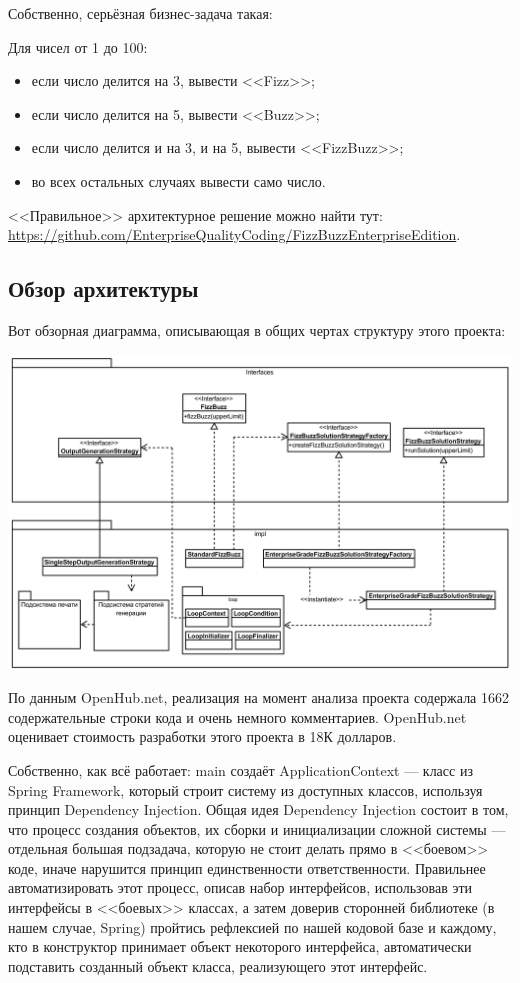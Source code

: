 \documentclass[a5paper]{article}
\begin{document}
Собственно, серьёзная бизнес-задача такая:

Для чисел от 1 до 100:
\begin{itemize}
    \item если число делится на 3, вывести <<Fizz>>;
    \item если число делится на 5, вывести <<Buzz>>;
    \item если число делится и на 3, и на 5, вывести <<FizzBuzz>>;
    \item во всех остальных случаях вывести само число.
\end{itemize}

<<Правильное>> архитектурное решение можно найти тут: \url{https://github.com/EnterpriseQualityCoding/FizzBuzzEnterpriseEdition}.

\subsection{Обзор архитектуры}

Вот обзорная диаграмма, описывающая в общих чертах структуру этого проекта:

\begin{center}
    \includegraphics[width=\textwidth]{fizzBuzzArchitecture.png}
\end{center}

По данным OpenHub.net, реализация на момент анализа проекта содержала 1662 содержательные строки кода и очень немного комментариев. OpenHub.net оценивает стоимость разработки этого проекта в 18К долларов.

Собственно, как всё работает: main создаёт ApplicationContext --- класс из Spring Framework, который строит систему из доступных классов, используя принцип Dependency Injection. Общая идея Dependency Injection состоит в том, что процесс создания объектов, их сборки и инициализации сложной системы --- отдельная большая подзадача, которую не стоит делать прямо в <<боевом>> коде, иначе нарушится принцип единственности ответственности. Правильнее автоматизировать этот процесс, описав набор интерфейсов, использовав эти интерфейсы в <<боевых>> классах, а затем доверив сторонней библиотеке (в нашем случае, Spring) пройтись рефлексией по нашей кодовой базе и каждому, кто в конструктор принимает объект некоторого интерфейса, автоматически подставить созданный объект класса, реализующего этот интерфейс.
\end{document}
